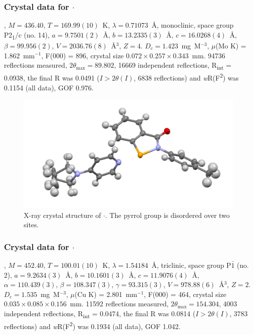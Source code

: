 \begin{refsection}
\subsubsection{Crystal data for \texorpdfstring{$\cdot$}{C23 H23 N3 O Se}}
, $M=436.40$, $T=169.99(10)$~K, $\lambda=0.71073$~\AA, monoclinic, space group P2\textsubscript{1}/c (no. 14), $a = 9.7501(2)$~\AA, $b = 13.2335(3)$~\AA, $c = 16.0268(4)$~\AA, $\beta = 99.956(2)$\degree, $V = 2036.76(8)$~\AA$^{3}$, $Z = 4$. $D_{c}= 1.423$~mg~M$^{-3}$, $\mu$(Mo K\a) = 1.862~mm$^{-1}$, F(000) = 896, crystal size $0.072 \times 0.257 \times 0.343$~mm. 94736 reflections measured, $2\theta_{\mathrm{max}}=89.802$\degree, 16669 independent reflections, R\textsubscript{int} = 0.0938, the final R was 0.0491 ($I > 2\theta(I)$, 6838 reflections) and \emph{w}R(F\textsuperscript{2}) was 0.1154 (all data), GOF 0.976.

\begin{figure}
  \includegraphics[width=0.6\linewidth]{Figures/ebs-4me-pyrrol-xtal.pdf}
  \caption[X-ray crystal structure of \texorpdfstring{$\cdot$}{C23 H23 N3 O Se}.]{X-ray crystal structure of \texorpdfstring{$\cdot$}{C23 H23 N3 O Se}. The pyrrol group is disordered over two sites.}
\end{figure}

\subsubsection{Crystal data for \texorpdfstring{$\cdot$}{C23 H23 N3 O2 Se}}
, $M=452.40$, $T=100.01(10)$~K, $\lambda=1.54184$~\AA, triclinic, space group P$\bar{1}$ (no. 2), $a = 9.2634(3)$~\AA, $b = 10.1601(3)$~\AA, $c = 11.9076(4)$~\AA, $\alpha = 110.439(3)$\degree, $\beta = 108.347(3)$\degree, $\gamma = 93.315(3)$\degree, $V = 978.88(6)$~\AA$^{3}$, $Z = 2$. $D_{c}= 1.535$~mg~M$^{-3}$, $\mu$(Cu K\a) = 2.801~mm$^{-1}$, F(000) = 464, crystal size $0.035 \times 0.085 \times 0.156$~mm. 11592 reflections measured, $2\theta_{\mathrm{max}}=154.304$\degree, 4003 independent reflections, R\textsubscript{int} = 0.0474, the final R was 0.0814 ($I > 2\theta(I)$, 3783 reflections) and \emph{w}R(F\textsuperscript{2}) was 0.1934 (all data), GOF 1.042.


\end{refsection}
